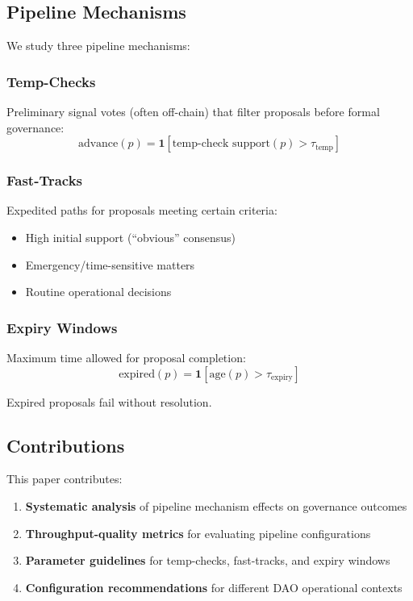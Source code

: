\subsection{Pipeline Mechanisms}

We study three pipeline mechanisms:

\subsubsection{Temp-Checks}

Preliminary signal votes (often off-chain) that filter proposals before formal governance:
\begin{equation}
\text{advance}(p) = \mathbf{1}[\text{temp-check support}(p) > \tau_{\text{temp}}]
\end{equation}

\subsubsection{Fast-Tracks}

Expedited paths for proposals meeting certain criteria:
\begin{itemize}
    \item High initial support (``obvious'' consensus)
    \item Emergency/time-sensitive matters
    \item Routine operational decisions
\end{itemize}

\subsubsection{Expiry Windows}

Maximum time allowed for proposal completion:
\begin{equation}
\text{expired}(p) = \mathbf{1}[\text{age}(p) > \tau_{\text{expiry}}]
\end{equation}

Expired proposals fail without resolution.

\subsection{Contributions}

This paper contributes:

\begin{enumerate}
    \item \textbf{Systematic analysis} of pipeline mechanism effects on governance outcomes
    \item \textbf{Throughput-quality metrics} for evaluating pipeline configurations
    \item \textbf{Parameter guidelines} for temp-checks, fast-tracks, and expiry windows
    \item \textbf{Configuration recommendations} for different DAO operational contexts
\end{enumerate}

